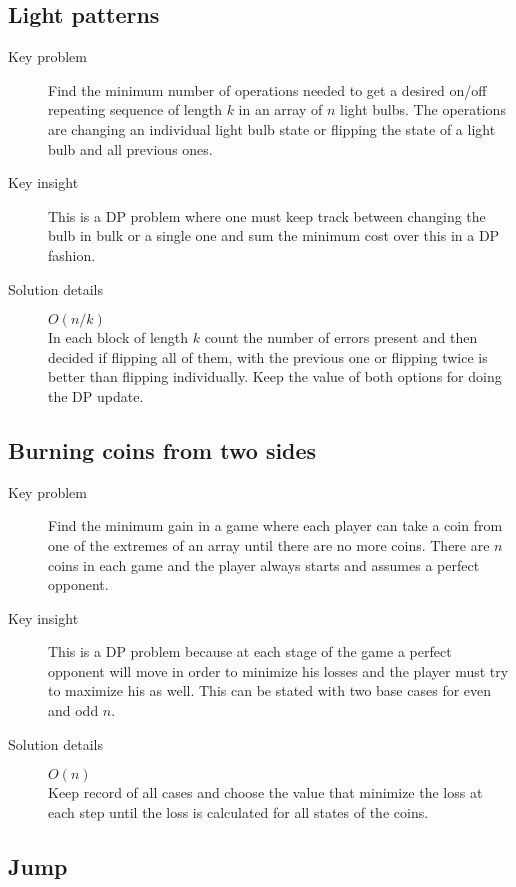 \documentclass[11pt]{book}
\begin{document}
\subsection{Light patterns}

\begin{description}
	\item[Key problem] Find the minimum number of operations needed to get a desired on/off repeating sequence of length $k$ in an array of $n$ light bulbs. The operations are changing an individual light bulb state or flipping the state of a light bulb and all previous ones.
	\item[Key insight] This is a DP problem where one must keep track between changing the bulb in bulk or a single one and sum the minimum cost over this in a DP fashion.
	\item[Solution details] $O(n/k)$ \\ In each block of length $k$ count the number of errors present and then decided if flipping all of them, with the previous one or flipping twice is better than flipping individually. Keep the value of both options for doing the DP update.
\end{description}

\subsection{Burning coins from two sides}

\begin{description}
	\item[Key problem] Find the minimum gain in a game where each player can take a coin from one of the extremes of an array until there are no more coins. There are $n$ coins in each game and the player always starts and assumes a perfect opponent.
	\item[Key insight] This is a DP problem because at each stage of the game a perfect opponent will move in order to minimize his losses and the player must try to maximize his as well. This can be stated with two base cases for even and odd $n$.
	\item[Solution details] $O(n)$ \\ Keep record of all cases and choose the value that minimize the loss at each step until the loss is calculated for all states of the coins.
\end{description}

\subsection{Jump}
\end{document}
